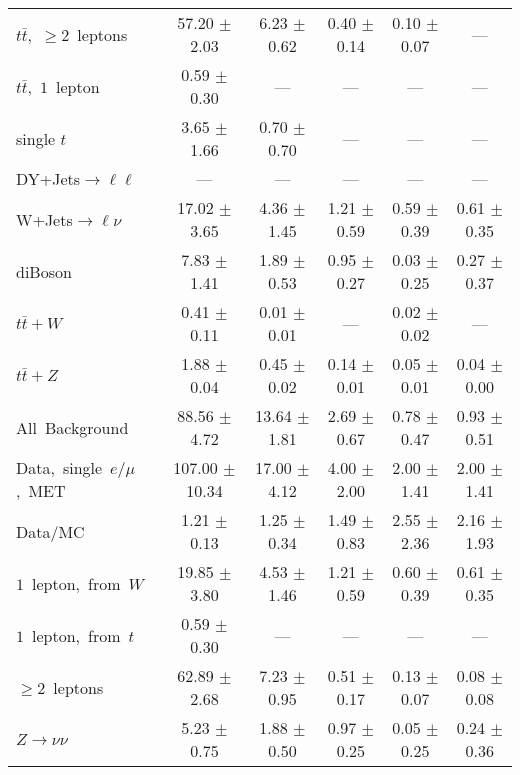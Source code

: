 \documentclass{article}
\begin{document}
\begin{longtable}{|l|c|c|c|c|c|}
$t\bar{t}$,~$\ge2$~leptons & 57.20 $\pm$ 2.03  & 6.23 $\pm$ 0.62  & 0.40 $\pm$ 0.14  & 0.10 $\pm$ 0.07  & --- \\* 
$t\bar{t}$,~$1$~lepton & 0.59 $\pm$ 0.30  & ---  & ---  & ---  & --- \\* 
single $t$  & 3.65 $\pm$ 1.66  & 0.70 $\pm$ 0.70  & ---  & ---  & --- \\* 
DY+Jets$\rightarrow\ell\ell$  & ---  & ---  & ---  & ---  & --- \\* 
W+Jets$\rightarrow\ell\nu$  & 17.02 $\pm$ 3.65  & 4.36 $\pm$ 1.45  & 1.21 $\pm$ 0.59  & 0.59 $\pm$ 0.39  & 0.61 $\pm$ 0.35 \\* 
diBoson  & 7.83 $\pm$ 1.41  & 1.89 $\pm$ 0.53  & 0.95 $\pm$ 0.27  & 0.03 $\pm$ 0.25  & 0.27 $\pm$ 0.37 \\* 
$t\bar{t}+W$  & 0.41 $\pm$ 0.11  & 0.01 $\pm$ 0.01  & ---  & 0.02 $\pm$ 0.02  & --- \\* 
$t\bar{t}+Z$  & 1.88 $\pm$ 0.04  & 0.45 $\pm$ 0.02  & 0.14 $\pm$ 0.01  & 0.05 $\pm$ 0.01  & 0.04 $\pm$ 0.00 \\* 
\hline \hline 
All~Background  & 88.56 $\pm$ 4.72  & 13.64 $\pm$ 1.81  & 2.69 $\pm$ 0.67  & 0.78 $\pm$ 0.47  & 0.93 $\pm$ 0.51 \\* 
Data,~single~$e/\mu$,~MET  & 107.00 $\pm$ 10.34  & 17.00 $\pm$ 4.12  & 4.00 $\pm$ 2.00  & 2.00 $\pm$ 1.41  & 2.00 $\pm$ 1.41 \\* 
Data/MC  & 1.21 $\pm$ 0.13  & 1.25 $\pm$ 0.34  & 1.49 $\pm$ 0.83  & 2.55 $\pm$ 2.36  & 2.16 $\pm$ 1.93 \\* 
\hline \hline 
$1$~lepton,~from~$W$  & 19.85 $\pm$ 3.80  & 4.53 $\pm$ 1.46  & 1.21 $\pm$ 0.59  & 0.60 $\pm$ 0.39  & 0.61 $\pm$ 0.35 \\* 
$1$~lepton,~from~$t$  & 0.59 $\pm$ 0.30  & ---  & ---  & ---  & --- \\* 
$\ge2$~leptons  & 62.89 $\pm$ 2.68  & 7.23 $\pm$ 0.95  & 0.51 $\pm$ 0.17  & 0.13 $\pm$ 0.07  & 0.08 $\pm$ 0.08 \\* 
$Z\rightarrow\nu\nu$  & 5.23 $\pm$ 0.75  & 1.88 $\pm$ 0.50  & 0.97 $\pm$ 0.25  & 0.05 $\pm$ 0.25  & 0.24 $\pm$ 0.36 \\* 
\hline 
\end{longtable} 

 
 
 
 
\pagebreak 

 
 
 
 
\end{document}
